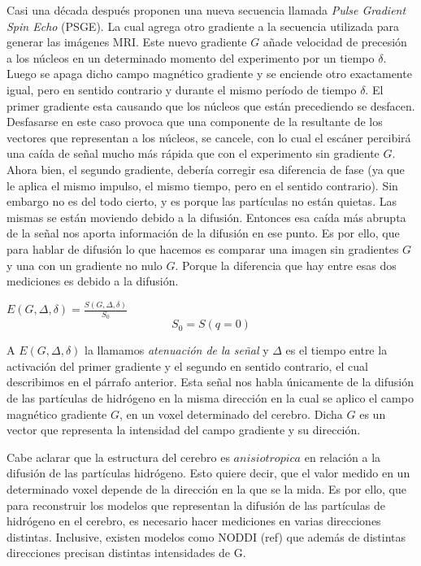 \documentclass[11pt,a4paper,twoside]{tesis}
\begin{document}
Casi una d\'ecada despu\'es \citet{Stejskal1965} proponen una nueva secuencia 
llamada \textit{Pulse Gradient Spin Echo} (PSGE). La cual agrega otro
gradiente a la secuencia utilizada para generar las imágenes MRI. Este nuevo 
gradiente $G$ a\~nade velocidad de precesi\'on a los n\'ucleos en un 
determinado momento del experimento por un tiempo $\delta$. Luego se apaga dicho 
campo magn\'etico gradiente y se enciende otro exactamente igual, pero en 
sentido contrario y durante el mismo per\'iodo de tiempo $\delta$. El primer 
gradiente esta causando que los n\'ucleos que est\'an precediendo se desfacen. 
Desfasarse en este caso provoca que una componente de la resultante de los 
vectores que representan a los n\'ucleos, se cancele, con lo 
cual el escáner percibir\'a una ca\'ida de se\~nal mucho m\'as r\'apida que con 
el experimento sin gradiente $G$. Ahora bien, el segundo gradiente, debería  
corregir esa diferencia de fase (ya que le 
aplica el mismo impulso, el mismo tiempo, pero en el sentido contrario). Sin embargo no es del todo 
cierto, y es porque las part\'iculas no est\'an quietas. Las mismas se est\'an moviendo debido a la 
difusi\'on. Entonces esa caída más abrupta de la señal nos 
aporta informaci\'on de la difusión en ese punto. Es por ello, que para 
hablar de difusi\'on lo que hacemos es comparar una 
imagen sin gradientes $G$ y una con un gradiente no nulo $G$. Porque la 
diferencia que hay entre 
esas dos mediciones es debido a la difusi\'on.


\begin{center}
$E(G, \Delta, \delta) = \frac{S(G, \Delta, \delta)}{S_0}$ 
$$S_0=S(q=0)$$
\end{center}

A $E(G, \Delta, \delta)$ la llamamos \textit{atenuaci\'on de la señal} y 
$\Delta$ es el tiempo entre la activación del primer gradiente y el segundo en 
sentido contrario, el cual describimos en el párrafo anterior. Esta señal nos 
habla 
\'unicamente de la difusi\'on de las part\'iculas de hidr\'ogeno en la misma 
direcci\'on en la cual 
se aplico el campo magn\'etico gradiente $G$, en un voxel determinado del 
cerebro. Dicha $G$ es un vector que representa la intensidad 
del campo gradiente y su direcci\'on.

Cabe aclarar que la estructura del cerebro es $anisiotropica$ en relación 
a la difusión de las part\'iculas hidrógeno. Esto quiere decir, que el valor 
medido en un determinado voxel depende de la direcci\'on en la que se la mida. 
Es por ello, que para reconstruir los modelos que 
representan la difusi\'on de las partículas de hidrógeno en el cerebro, es 
necesario hacer mediciones en varias direcciones distintas. Inclusive, existen 
modelos como NODDI (ref) que adem\'as de distintas direcciones precisan 
distintas intensidades de G. 
\end{document}
